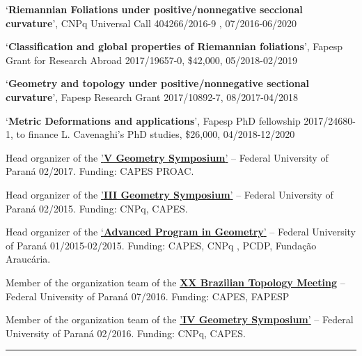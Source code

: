 \documentclass[10pt]{article}
\newenvironment{innerlist}[1][\enskip\textbullet]%
{\begin{compactitem}[#1]}{\end{compactitem}}
\begin{document}
	\vspace{0.5em}
	\begin{innerlist}[-]
		
\item 	`\textbf{Riemannian Foliations under positive/nonnegative seccional curvature}', CNPq Universal Call 404266/2016-9 , 07/2016-06/2020
	
	
\item 	`\textbf{Classification and global properties of Riemannian foliations}', Fapesp Grant for Research Abroad 2017/19657-0, \$42,000,  05/2018-02/2019
	
	
\item 	`\textbf{Geometry and topology under positive/nonnegative sectional curvature}', Fapesp Research Grant  2017/10892-7,  08/2017-04/2018
	
\item 	`\textbf{Metric Deformations and applications}', Fapesp PhD fellowship 2017/24680-1, to finance L. Cavenaghi's PhD studies, \$26,000, 04/2018-12/2020 
	
		\item 
Head  organizer of the \href{http://www.matematica.ufpr.br/old/verao/2017/m4_geometria.html}{'\textbf{V Geometry Symposium}'} -- Federal University of Paraná 02/2017.  Funding: CAPES PROAC. 
	\item Head organizer of the \href{http://www.matematica.ufpr.br/old/verao/2015/m4_geometria.html}{'\textbf{III Geometry Symposium}'} -- Federal University of Paraná 02/2015. Funding: CNPq, CAPES.
\item  Head organizer of the \href{https://geometriatopologiaufpr.wordpress.com/programa-avancado-de-verao-em-geometria/}{`\textbf{Advanced Program in Geometry}'} -- Federal University of Paraná 01/2015-02/2015. Funding: CAPES, CNPq ,  PCDP, Fundação Araucária. 
	\item Member of the organization team of the \href{http://www.20ebt.ufpr.br}{\textbf{XX Brazilian Topology Meeting}} -- Federal University of Paraná 07/2016. Funding: CAPES, FAPESP
	\item Member of the organization team of the \href{http://www.matematica.ufpr.br/old/verao/2016/m4_geometria.html}{'\textbf{IV Geometry Symposium}'} -- Federal University of Paraná 02/2016. Funding: CNPq, CAPES. 
	\end{innerlist}
	
	
	\rule{\columnwidth}{.5pt}%
	
	\vspace{-1em}
	
\end{document}
